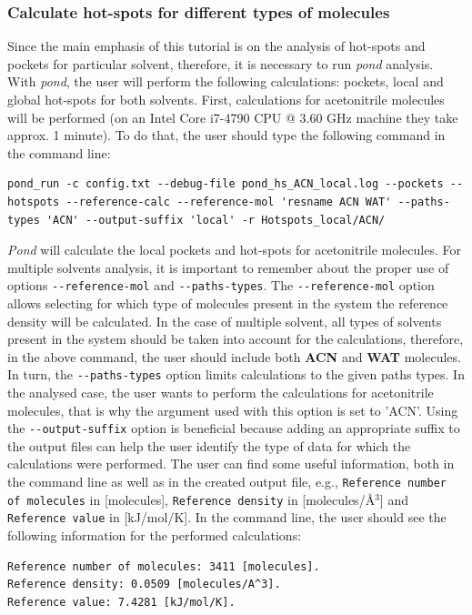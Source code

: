 \documentclass[9pt,tutorial]{livecoms}
\begin{document}
\subsubsection{Calculate hot-spots for different types of molecules}
Since the main emphasis of this tutorial is on the analysis of hot-spots and pockets for particular solvent, therefore, it is necessary to run \emph{pond} analysis. With \emph{pond}, the user will perform the following calculations: pockets, local and global hot-spots for both solvents. First, calculations for acetonitrile molecules will be performed (on an Intel Core i7-4790 CPU @ 3.60 GHz machine they take approx. 1 minute). To do that, the user should type the following command in the command line:
\begin{lstlisting}
pond_run -c config.txt --debug-file pond_hs_ACN_local.log --pockets --hotspots --reference-calc --reference-mol 'resname ACN WAT' --paths-types 'ACN' --output-suffix 'local' -r Hotspots_local/ACN/ 
\end{lstlisting}
\emph{Pond} will calculate the local pockets and hot-spots for acetonitrile molecules. For multiple solvents analysis, it is important to remember about the proper use of options \texttt{-{}-reference-mol} and \texttt{-{}-paths-types}. The \texttt{-{}-reference-mol} option allows selecting for which type of molecules present in the system the reference density will be calculated. In the case of multiple solvent, all types of solvents present in the system should be taken into account for the calculations, therefore, in the above command, the user should include both \textbf{ACN} and \textbf{WAT} molecules. In turn, the \texttt{-{}-paths-types} option limits calculations to the given paths types. In the analysed case, the user wants to perform the calculations for acetonitrile molecules, that is why the argument used with this option is set to 'ACN'. Using the \texttt{-{}-output-suffix} option is beneficial because adding an appropriate suffix to the output files can help the user identify the type of data for which the calculations were performed. 
The user can find some useful information, both in the command line as well as in the created output file, e.g., \texttt{Reference number of molecules} in [molecules], \texttt{Reference density} in [molecules/Å\( \displaystyle ^{3}\)] and \texttt{Reference value} in [kJ/mol/K]. In the command line, the user should see the following information for the performed calculations: 
\begin{lstlisting}[columns=fullflexible]
Reference number of molecules: 3411 [molecules].
Reference density: 0.0509 [molecules/A^3].
Reference value: 7.4281 [kJ/mol/K].
\end{lstlisting}
\end{document}
